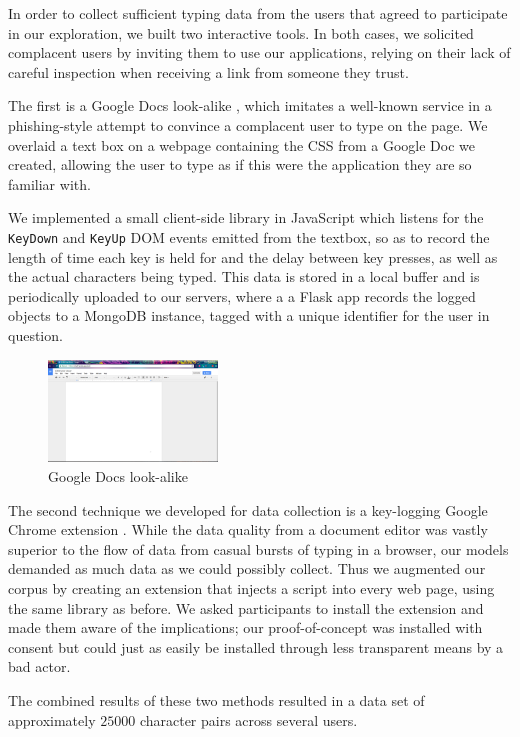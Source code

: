 \documentclass[9pt,journal]{IEEEtran}
\begin{document}
In order to collect sufficient typing data from the users that agreed to participate in our exploration, we built two interactive tools. In both cases, we solicited complacent users by inviting them to use our applications, relying on their lack of careful inspection when receiving a link from someone they trust.

The first is a Google Docs look-alike \cite{gdocs}, which imitates a well-known service in a phishing-style attempt to convince a complacent user to type on the page. We overlaid a text box on a webpage containing the CSS from a Google Doc we created, allowing the user to type as if this were the application they are so familiar with.

We implemented a small client-side library in JavaScript which listens for the \texttt{KeyDown} and \texttt{KeyUp} DOM events emitted from the textbox, so as to record the length of time each key is held for and the delay between key presses, as well as the actual characters being typed. This data is stored in a local buffer and is periodically uploaded to our servers, where a a Flask app records the logged objects to a MongoDB instance, tagged with a unique identifier for the user in question.

\begin{figure}[H]
  \centering
  \includegraphics[width=0.4\textwidth]{gdocs}
  \caption{Google Docs look-alike}
\end{figure}

The second technique we developed for data collection is a key-logging Google Chrome extension \cite{extension}. While the data quality from a document editor was vastly superior to the flow of data from casual bursts of typing in a browser, our models demanded as much data as we could possibly collect. Thus we augmented our corpus by creating an extension that injects a script into every web page, using the same library as before. We asked participants to install the extension and made them aware of the implications; our proof-of-concept was installed with consent but could just as easily be installed through less transparent means by a bad actor.

The combined results of these two methods resulted in a data set of approximately $25000$ character pairs across several users.
\end{document}
